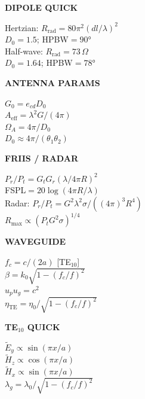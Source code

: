 \documentclass[6pt,letterpaper]{article}
\newcommand{\shead}[3]{%
  \noindent\colorbox{#1}{\parbox{\dimexpr\linewidth-2\fboxsep\relax}%
  {\color{#2}\bfseries\fontsize{6}{7}\selectfont #3}}\vspace{0.5pt}}
\begin{document}
\vfill
\noindent
\begin{minipage}[t]{0.19\linewidth}
\shead{amberbg}{amber}{DIPOLE QUICK}
\begin{ebox}
Hertzian: $R_\text{rad}=80\pi^2(dl/\lambda)^2$\\
$D_0=1.5$; HPBW$=90°$\\
Half-wave: $R_\text{rad}=73\,\Omega$\\
$D_0=1.64$; HPBW$=78°$
\end{ebox}
\end{minipage}\hfill
\begin{minipage}[t]{0.19\linewidth}
\shead{greenbg}{green}{ANTENNA PARAMS}
\begin{ebox}
$G_0=e_{cd}D_0$\\
$A_\text{eff}=\lambda^2 G/(4\pi)$\\
$\Omega_A=4\pi/D_0$\\
$D_0\approx4\pi/(\theta_1\theta_2)$
\end{ebox}
\end{minipage}\hfill
\begin{minipage}[t]{0.19\linewidth}
\shead{greenbg}{green}{FRIIS / RADAR}
\begin{ebox}
$P_r/P_t=G_tG_r(\lambda/4\pi R)^2$\\
FSPL$=20\log(4\pi R/\lambda)$\\
Radar: $P_r/P_t=G^2\lambda^2\sigma/((4\pi)^3R^4)$\\
$R_\text{max}\propto(P_tG^2\sigma)^{1/4}$
\end{ebox}
\end{minipage}\hfill
\begin{minipage}[t]{0.19\linewidth}
\shead{bluebg}{blue}{WAVEGUIDE}
\begin{ebox}
$f_c=c/(2a)$ [TE$_{10}$]\\
$\beta=k_0\sqrt{1-(f_c/f)^2}$\\
$u_pu_g=c^2$\\
$\eta_\text{TE}=\eta_0/\sqrt{1-(f_c/f)^2}$
\end{ebox}
\end{minipage}\hfill
\begin{minipage}[t]{0.19\linewidth}
\shead{bluebg}{blue}{TE$_{10}$ QUICK}
\begin{ebox}
$\tilde{E}_y\propto\sin(\pi x/a)$\\
$\tilde{H}_z\propto\cos(\pi x/a)$\\
$\tilde{H}_x\propto\sin(\pi x/a)$\\
$\lambda_g=\lambda_0/\sqrt{1-(f_c/f)^2}$
\end{ebox}
\end{minipage}
\end{document}
